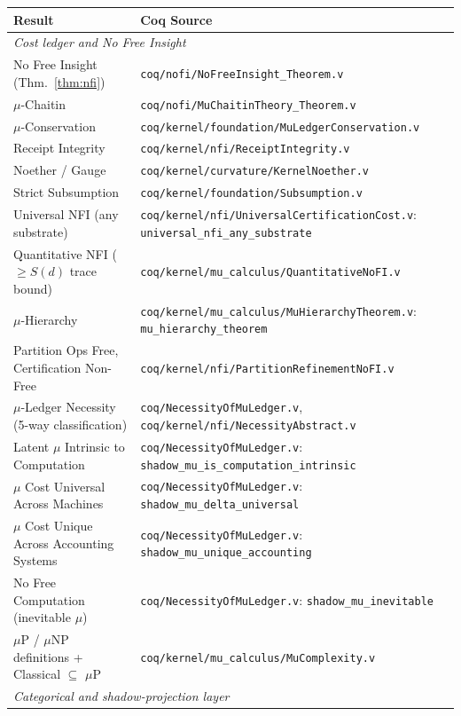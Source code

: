 \documentclass[11pt, a4paper]{report}
\theoremstyle{definition}
\theoremstyle{plain}
\begin{document}
\begin{center}
\small
\begin{tabular}{ll}
\textbf{Result} & \textbf{Coq Source} \\
\hline
\multicolumn{2}{l}{\emph{Cost ledger and No Free Insight}} \\
\hline
No Free Insight (Thm.~\ref{thm:nfi}) & \texttt{coq/nofi/NoFreeInsight\_Theorem.v} \\
$\mu$-Chaitin & \texttt{coq/nofi/MuChaitinTheory\_Theorem.v} \\
$\mu$-Conservation & \texttt{coq/kernel/foundation/MuLedgerConservation.v} \\
Receipt Integrity & \texttt{coq/kernel/nfi/ReceiptIntegrity.v} \\
Noether / Gauge & \texttt{coq/kernel/curvature/KernelNoether.v} \\
Strict Subsumption & \texttt{coq/kernel/foundation/Subsumption.v} \\
Universal NFI (any substrate) & \texttt{coq/kernel/nfi/UniversalCertificationCost.v}: \texttt{universal\_nfi\_any\_substrate} \\
Quantitative NFI ($\ge S(d)$ trace bound) & \texttt{coq/kernel/mu\_calculus/QuantitativeNoFI.v} \\
$\mu$-Hierarchy & \texttt{coq/kernel/mu\_calculus/MuHierarchyTheorem.v}: \texttt{mu\_hierarchy\_theorem} \\
Partition Ops Free, Certification Non-Free & \texttt{coq/kernel/nfi/PartitionRefinementNoFI.v} \\
$\mu$-Ledger Necessity (5-way classification) & \texttt{coq/NecessityOfMuLedger.v}, \texttt{coq/kernel/nfi/NecessityAbstract.v} \\
Latent $\mu$ Intrinsic to Computation & \texttt{coq/NecessityOfMuLedger.v}: \texttt{shadow\_mu\_is\_computation\_intrinsic} \\
$\mu$ Cost Universal Across Machines & \texttt{coq/NecessityOfMuLedger.v}: \texttt{shadow\_mu\_delta\_universal} \\
$\mu$ Cost Unique Across Accounting Systems & \texttt{coq/NecessityOfMuLedger.v}: \texttt{shadow\_mu\_unique\_accounting} \\
No Free Computation (inevitable $\mu$) & \texttt{coq/NecessityOfMuLedger.v}: \texttt{shadow\_mu\_inevitable} \\
$\mu$P / $\mu$NP definitions + Classical $\subseteq$ $\mu$P & \texttt{coq/kernel/mu\_calculus/MuComplexity.v} \\
\hline
\multicolumn{2}{l}{\emph{Categorical and shadow-projection layer}} \\

\end{tabular}
\end{center}
\end{document}
